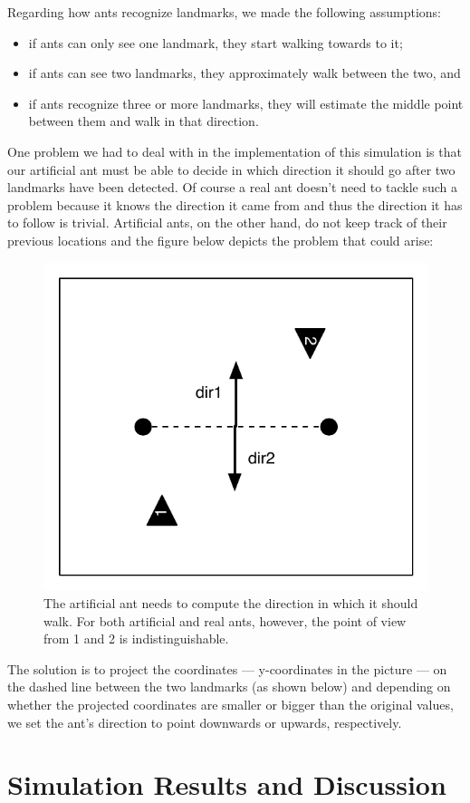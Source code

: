 \documentclass[11pt]{article}
\begin{document}
Regarding how ants recognize landmarks, we made the following assumptions:
\begin{itemize}
\item if ants can only see one landmark, they start walking towards to it;
\item if ants can see two landmarks, they approximately walk between the two, and
\item if ants recognize three or more landmarks, they will estimate the middle point between them and walk in that direction.
\end{itemize}

One problem we had to deal with in the implementation of this simulation is that our artificial ant must be able to decide in which direction it should go after two landmarks have been detected. Of course a real ant doesn't need to tackle such a problem because it knows the direction it came from and thus the direction it has to follow is trivial. Artificial ants, on the other hand, do not keep track of their previous locations and the figure below depicts the problem that could arise:

\begin{figure}[h!]
  \centering
    \includegraphics[width=.6\textwidth]{images/ambiguous_direction}
     \caption{The artificial ant needs to compute the direction in which it should walk. For both artificial and real ants, however, the point of view from 1 and 2 is indistinguishable.}
\end{figure}

The solution is to project the coordinates --- y-coordinates in the picture --- on the dashed line between the two landmarks (as shown below) and depending on whether the projected coordinates are smaller or bigger than the original values, we set the ant's direction to point downwards or upwards, respectively.
\newpage
\section{Simulation Results and Discussion}
\end{document}
